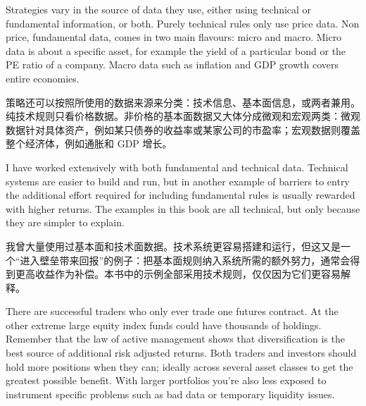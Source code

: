 
\begin{englishblock} Strategies vary in the source of data they use, either using technical or fundamental information, or both. Purely technical rules only use price data. Non price, fundamental data, comes in two main flavours: micro and macro. Micro data is about a specific asset, for example the yield of a particular bond or the PE ratio of a company. Macro data such as inflation and GDP growth covers entire economies. \end{englishblock}

\begin{chineseblock}策略还可以按照所使用的数据来源来分类：技术信息、基本面信息，或两者兼用。纯技术规则只看价格数据。非价格的基本面数据又大体分成微观和宏观两类：微观数据针对具体资产，例如某只债券的收益率或某家公司的市盈率；宏观数据则覆盖整个经济体，例如通胀和 GDP 增长。\end{chineseblock}

\bipairgap

\begin{englishblock} I have worked extensively with both fundamental and technical data. Technical systems are easier to build and run, but in another example of barriers to entry the additional effort required for including fundamental rules is usually rewarded with higher returns. The examples in this book are all technical, but only because they are simpler to explain. \end{englishblock}

\begin{chineseblock}我曾大量使用过基本面和技术面数据。技术系统更容易搭建和运行，但这又是一个“进入壁垒带来回报”的例子：把基本面规则纳入系统所需的额外努力，通常会得到更高收益作为补偿。本书中的示例全部采用技术规则，仅仅因为它们更容易解释。\end{chineseblock}


\begin{englishblock} There are successful traders who only ever trade one futures contract. At the other extreme large equity index funds could have thousands of holdings. Remember that the law of active management shows that diversification is the best source of additional risk adjusted returns. Both traders and investors should hold more positions when they can; ideally across several asset classes to get the greatest possible benefit. With larger portfolios you're also less exposed to instrument specific problems such as bad data or temporary liquidity issues. \end{englishblock}

